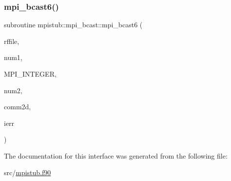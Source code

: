 \subsubsection{\texorpdfstring{mpi\_bcast6()}{mpi\_bcast6()}}
{\footnotesize\ttfamily subroutine mpistub\+::mpi\+\_\+bcast\+::mpi\+\_\+bcast6 (\begin{DoxyParamCaption}\item[{double precision, dimension(\+:,\+:,\+:)}]{rffile,  }\item[{}]{num1,  }\item[{}]{M\+P\+I\+\_\+\+I\+N\+T\+E\+G\+ER,  }\item[{}]{num2,  }\item[{integer}]{comm2d,  }\item[{}]{ierr }\end{DoxyParamCaption})}



The documentation for this interface was generated from the following file\+:\begin{DoxyCompactItemize}
\item 
src/\mbox{\hyperlink{mpistub_8f90}{mpistub.\+f90}}\end{DoxyCompactItemize}
